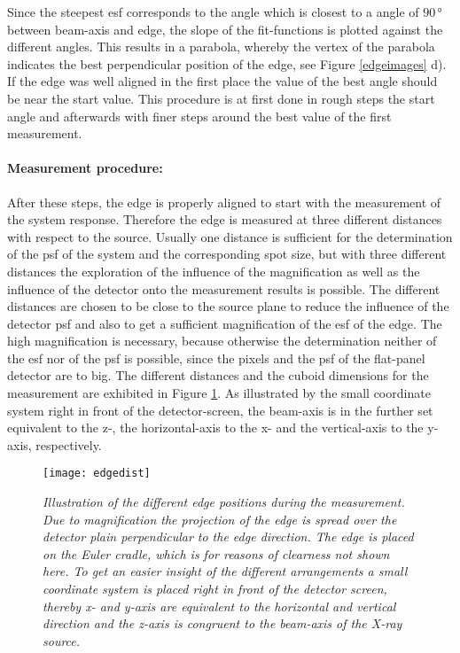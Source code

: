 Since the steepest \gls{esf} corresponds to the angle which is closest to a angle of $90\,$° between beam-axis and edge, the slope of the fit-functions is plotted against the different angles. This results in a parabola, whereby the vertex of the parabola indicates the best perpendicular position of the edge, see Figure \ref{edgeimages} d). If the edge was well aligned in the first place the value of the best angle should be near the start value. This procedure is at first done in rough steps the start angle and afterwards with finer steps around the best value of the first measurement. 
\paragraph{Measurement procedure:}
After these steps, the edge is properly aligned to start with the measurement of the system response. Therefore the edge is measured at three different distances with respect to the source. Usually one distance is sufficient for the determination of the \gls{psf} of the system and the corresponding spot size, but with three different distances the exploration of the influence of the magnification as well as the influence of the detector onto the measurement results is possible. The different distances are chosen to be close to the source plane to reduce the influence of the detector \gls{psf} and also to get a sufficient magnification of the \gls{esf} of the edge. The high magnification is necessary, because otherwise  the determination neither of the \gls{esf} nor of the \gls{psf} is possible, since the pixels and the \acrshort{psf} of the flat-panel detector are to big. The different distances and the cuboid dimensions for the measurement are exhibited in Figure \ref{edgedist}. As illustrated by the small coordinate system right in front of the detector-screen, the beam-axis is in the further set equivalent to the z-, the horizontal-axis to the x- and the vertical-axis to the y-axis, respectively.
\begin{figure}[h]
	\begin{center}
		\texttt{[image: edgedist]}
	\end{center}
	\caption[Illustration of the different edge positions for the measurement]{\textit{Illustration of the different edge positions during the measurement. Due to magnification the projection of the edge is spread over the detector plain perpendicular to the edge direction. The edge is placed on the Euler cradle, which is for reasons of clearness not shown here. To get an easier insight of the different arrangements a small coordinate system is placed right in front of the detector screen, thereby x- and y-axis are equivalent to the horizontal and vertical direction and the z-axis is congruent to the beam-axis of the X-ray source.}}
	\label{edgedist}
\end{figure}
